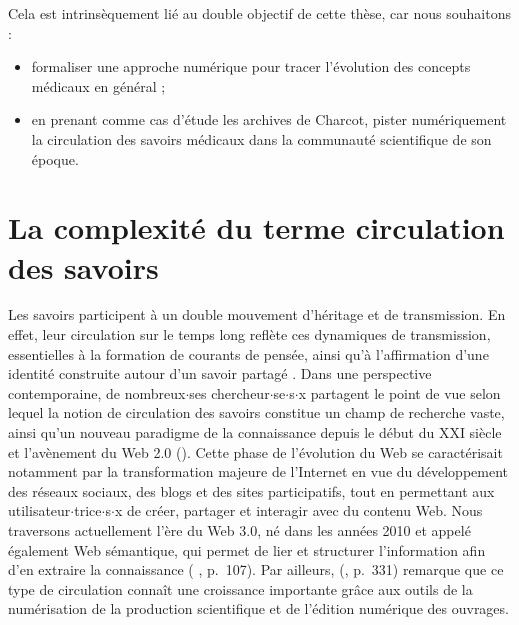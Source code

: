 Cela est intrinsèquement lié au double objectif de cette thèse, car nous souhaitons :
\begin{itemize} 
	\item formaliser une approche numérique pour tracer l'évolution des concepts médicaux en général ;
	\item en prenant comme cas d'étude les archives de Charcot, pister numériquement la circulation des savoirs médicaux dans la communauté scientifique de son époque.
\end{itemize}
\medskip








\section{La complexité du terme \og{}circulation des savoirs\fg{}}

Les savoirs participent à un double mouvement d'héritage et de transmission. En effet, leur circulation sur le temps long reflète ces dynamiques de transmission, essentielles à la formation de courants de pensée, ainsi qu'à l'affirmation d’une identité construite autour d'un savoir partagé \citep[p.~251]{adell2011chapitre}. Dans une perspective contemporaine, de nombreux$\cdot$ses chercheur$\cdot$se$\cdot$s$\cdot$x partagent le point de vue selon lequel la notion de circulation des savoirs constitue un champ de recherche vaste, ainsi qu'un nouveau paradigme de la connaissance depuis le début du XXI\ieme{} siècle et l'avènement du Web \textsc{2.0} (\citealp{landais2014frederic,quet2014frederic}). Cette phase de l'évolution du Web se caractérisait notamment par la transformation majeure de l'Internet en vue du développement des réseaux sociaux, des blogs et des sites participatifs, tout en permettant aux utilisateur$\cdot$trice$\cdot$s$\cdot$x de créer, partager et interagir avec du contenu Web. Nous traversons actuellement l'ère du Web \textsc{3.0}, né dans les années 2010 et appelé également \og{}Web sémantique\fg{}, qui permet de lier et structurer l'information afin d'en extraire la connaissance (\citeauthor{andrade2013sociologie} \citeyear{andrade2013sociologie}, p.~107). Par ailleurs, \citeauthor{landais2014frederic} (\citeyear{landais2014frederic}, p.~331) remarque que ce type de circulation connaît une croissance importante grâce aux outils de la numérisation de la production scientifique et de l'édition numérique des ouvrages.

